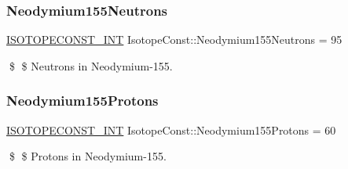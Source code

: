 \subsubsection{\texorpdfstring{Neodymium155\+Neutrons}{Neodymium155Neutrons}}
{\footnotesize\ttfamily \mbox{\hyperlink{group___isotope_const-_macros_ga5f18360b3e99483a35c32d789e62621c}{I\+S\+O\+T\+O\+P\+E\+C\+O\+N\+S\+T\+\_\+\+I\+NT}} Isotope\+Const\+::\+Neodymium155\+Neutrons = 95}

\$ \$ Neutrons in Neodymium-\/155. \mbox{\label{group___isotope_const-_neodymium-_nd155_gaa6945eef5392a439b5f4a89c3acc2877}} 
\subsubsection{\texorpdfstring{Neodymium155\+Protons}{Neodymium155Protons}}
{\footnotesize\ttfamily \mbox{\hyperlink{group___isotope_const-_macros_ga5f18360b3e99483a35c32d789e62621c}{I\+S\+O\+T\+O\+P\+E\+C\+O\+N\+S\+T\+\_\+\+I\+NT}} Isotope\+Const\+::\+Neodymium155\+Protons = 60}

\$ \$ Protons in Neodymium-\/155. 